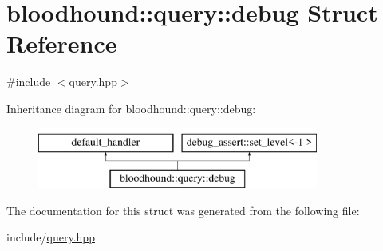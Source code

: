 \hypertarget{structbloodhound_1_1query_1_1debug}{}\section{bloodhound\+:\+:query\+:\+:debug Struct Reference}
\label{structbloodhound_1_1query_1_1debug}


{\ttfamily \#include $<$query.\+hpp$>$}

Inheritance diagram for bloodhound\+:\+:query\+:\+:debug\+:\begin{figure}[H]
\begin{center}
\leavevmode
\includegraphics[height=2.000000cm]{structbloodhound_1_1query_1_1debug}
\end{center}
\end{figure}


The documentation for this struct was generated from the following file\+:\begin{DoxyCompactItemize}
\item 
include/\hyperlink{query_8hpp}{query.\+hpp}\end{DoxyCompactItemize}
